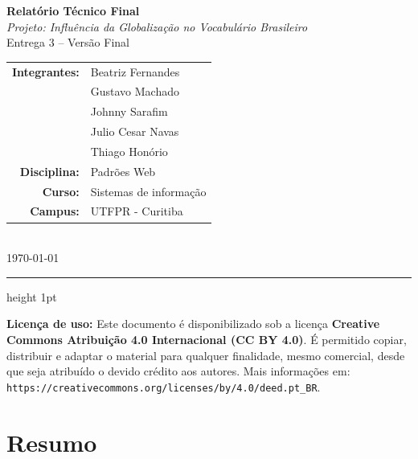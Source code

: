 \documentclass[12pt,a4paper]{article}
\begin{document}
\begin{center}
    {\textbf{\huge Relatório Técnico Final}}\\[2mm]
    {\large \textit{Projeto: Influência da Globalização no Vocabulário Brasileiro}}\\[2mm]
    {\normalsize Entrega 3 -- Versão Final}\\[6mm]
    {\normalsize
        \begin{tabular}{rl}
            \textbf{Integrantes:} & Beatriz Fernandes\\
                                  & Gustavo Machado \\
                                  & Johnny Sarafim\\
                                  & Julio Cesar Navas \\
                                  & Thiago Honório \\[3mm]
            \textbf{Disciplina:}  & Padrões Web \\
            \textbf{Curso:}       & Sistemas de informação\\
            \textbf{Campus:}      & UTFPR - Curitiba \\
        \end{tabular}
    }\\[6mm]
    \today
\end{center}

\vspace{4mm}
\hrule height 1pt
\vspace{6mm}

{\small
\noindent\textbf{Licença de uso:} Este documento é disponibilizado sob a licença
\textbf{Creative Commons Atribuição 4.0 Internacional (CC BY 4.0)}.
É permitido copiar, distribuir e adaptar o material para qualquer finalidade,
mesmo comercial, desde que seja atribuído o devido crédito aos autores.
Mais informações em: \texttt{https://creativecommons.org/licenses/by/4.0/deed.pt\_BR}.
}

\vspace{6mm}

\section{Resumo}
\end{document}
